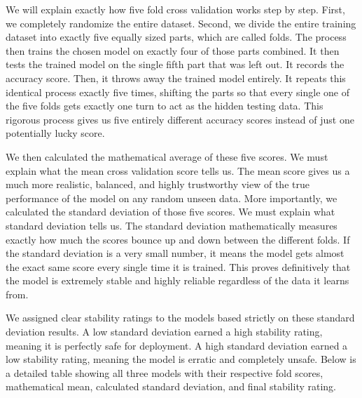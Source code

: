 \documentclass[12pt]{article}
\begin{document}
We will explain exactly how five fold cross validation works step by step. First, we completely randomize the entire dataset. Second, we divide the entire training dataset into exactly five equally sized parts, which are called folds. The process then trains the chosen model on exactly four of those parts combined. It then tests the trained model on the single fifth part that was left out. It records the accuracy score. Then, it throws away the trained model entirely. It repeats this identical process exactly five times, shifting the parts so that every single one of the five folds gets exactly one turn to act as the hidden testing data. This rigorous process gives us five entirely different accuracy scores instead of just one potentially lucky score. 

We then calculated the mathematical average of these five scores. We must explain what the mean cross validation score tells us. The mean score gives us a much more realistic, balanced, and highly trustworthy view of the true performance of the model on any random unseen data. More importantly, we calculated the standard deviation of those five scores. We must explain what standard deviation tells us. The standard deviation mathematically measures exactly how much the scores bounce up and down between the different folds. If the standard deviation is a very small number, it means the model gets almost the exact same score every single time it is trained. This proves definitively that the model is extremely stable and highly reliable regardless of the data it learns from. 

We assigned clear stability ratings to the models based strictly on these standard deviation results. A low standard deviation earned a high stability rating, meaning it is perfectly safe for deployment. A high standard deviation earned a low stability rating, meaning the model is erratic and completely unsafe. Below is a detailed table showing all three models with their respective fold scores, mathematical mean, calculated standard deviation, and final stability rating.

\begin{table}[H]
\centering
\caption{Cross Validation Results Table}
\end{table}
\end{document}
